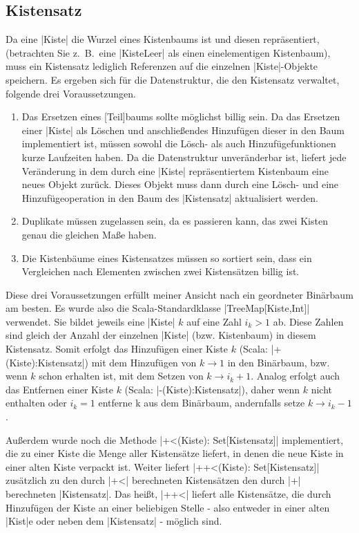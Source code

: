 \subsection{Kistensatz}
 Da eine |Kiste| die Wurzel eines Kistenbaums ist und diesen repräsentiert, (betrachten Sie z.\ B.\ eine |KisteLeer| als einen einelementigen Kistenbaum),
  muss ein Kistensatz lediglich Referenzen auf die einzelnen |Kiste|-Objekte speichern.
 Es ergeben sich für die Datenstruktur, die den Kistensatz verwaltet, folgende drei Voraussetzungen. 
\begin{enumerate}
 \item Das Ersetzen eines [Teil]baums sollte möglichst billig sein.
  Da das Ersetzen einer |Kiste| als Löschen und anschließendes Hinzufügen dieser in den Baum implementiert ist,
   müssen sowohl die Lösch- als auch Hinzufügefunktionen kurze Laufzeiten haben.
  Da die Datenstruktur unveränderbar ist, liefert jede Veränderung in dem durch eine |Kiste| repräsentiertem Kistenbaum eine neues Objekt zurück.
  Dieses Objekt muss dann durch eine Lösch- und eine Hinzufügeoperation in den Baum des |Kistensatz| aktualisiert werden.
 \item Duplikate müssen zugelassen sein, da es passieren kann, das zwei Kisten genau die gleichen Maße haben.
 \item Die Kistenbäume eines Kistensatzes müssen so sortiert sein, dass ein Vergleichen nach Elementen zwischen zwei Kistensätzen billig ist.
\end{enumerate}
Diese drei Voraussetzungen erfüllt meiner Ansicht nach ein geordneter Binärbaum am besten.
Es wurde also die Scala-Standardklasse |TreeMap[Kiste,Int]| verwendet. Sie bildet jeweils eine |Kiste| $k$ auf eine Zahl $i_k > 1$ ab.
Diese Zahlen sind gleich der Anzahl der einzelnen |Kiste| (bzw. Kistenbaum) in diesem Kistensatz.
Somit erfolgt das Hinzufügen einer Kiste $k$ (Scala: |+(Kiste):Kistensatz|) mit dem Hinzufügen von $k \rightarrow 1$ in den Binärbaum,
  bzw. wenn $k$ schon erhalten ist, mit dem Setzen von $k \rightarrow i_k + 1$.
Analog erfolgt auch das Entfernen einer Kiste $k$ (Scala: |-(Kiste):Kistensatz|),
  daher wenn $k$ nicht enthalten oder $i_k = 1$ entferne k aus dem Binärbaum, andernfalls setze $k \rightarrow i_k - 1$.

Außerdem wurde noch die Methode |+<(Kiste): Set[Kistensatz]| implementiert, die zu einer Kiste die Menge aller Kistensätze liefert,
in denen die neue Kiste in einer alten Kiste verpackt ist.
Weiter liefert |++<(Kiste): Set[Kistensatz]| zusätzlich zu den durch |+<| berechneten Kistensätzen den durch |+| berechneten |Kistensatz|.
Das heißt, |++<| liefert alle Kistensätze, die durch Hinzufügen der Kiste an einer beliebigen Stelle
 - also entweder in einer alten |Kist|e oder neben dem |Kistensatz| - möglich sind.
